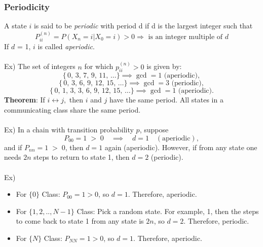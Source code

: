 \documentclass[12pt]{article}
\begin{document}
\subsubsection*{Periodicity}
A state $i$ is said to be \emph{periodic} with period d if d is the largest integer such that
\[
    P^{(n)}_{ii} = P(X_n=i|X_0=i) > 0 \Rightarrow \text{ is an integer multiple of } d  
\]
If $d$ = 1, $i$ is called \emph{aperiodic}.\\\\
Ex) The set of integers $n$ for which $p_{ii}^{(n)} > 0$ is given by:
\[
\{\,0,\,3,\,7,\,9,\,11,\,\dots\} \implies \gcd=1 \text{ (aperiodic)},
\]
\[
\{\,0,\,3,\,6,\,9,\,12,\,15,\,\dots\} \implies \gcd=3 \text{ (periodic)},
\]
\[
\{\,0,\,1,\,3,\,3,\,6,\,9,\,12,\,15,\,\dots\} \implies \gcd=1 \text{ (aperiodic)}.
\]
\textbf{Theorem}: If $i \leftrightarrow j,$ then $i$ and $j$ have the same period. All states in a communicating class share the same period.
\\\\
Ex) In a chain with transition probability $p$, suppose
\[
P_{00} = 1 \;>\; 0 \quad \implies \quad d=1 \quad (\text{aperiodic}),
\]
and if $P_{nn} = 1 \;>\; 0$, then $d=1$ again (aperiodic). However, if from any state one needs $2n$ steps to return to state 1, then $d=2$ (periodic).
\\\\
Ex)
\begin{center}
\end{center}
\begin{itemize}
    \item For $\{0\}$ Class: $P_{00} = 1 > 0$, so $d=1$. Therefore, aperiodic.
    \item For $\{1,2,..,N-1\}$ Class: Pick a random state. For example, 1, then the steps to come back to state 1 from any state is $2n$, so $d=2$. Therefore, periodic.
    \item For $\{N\}$ Class: $P_{NN} = 1 > 0$, so $d=1$. Therefore, aperiodic.
\end{itemize}
\newpage
\end{document}
